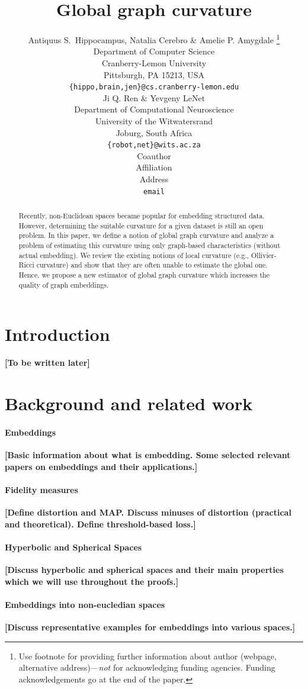 \documentclass{article} %
\title{Global graph curvature}
\author{Antiquus S.~Hippocampus, Natalia Cerebro \& Amelie P. Amygdale \thanks{ Use footnote for providing further information
about author (webpage, alternative address)---\emph{not} for acknowledging
funding agencies.  Funding acknowledgements go at the end of the paper.} \\
Department of Computer Science\\
Cranberry-Lemon University\\
Pittsburgh, PA 15213, USA \\
\texttt{\{hippo,brain,jen\}@cs.cranberry-lemon.edu} \\
\And
Ji Q. Ren \& Yevgeny LeNet \\
Department of Computational Neuroscience \\
University of the Witwatersrand \\
Joburg, South Africa \\
\texttt{\{robot,net\}@wits.ac.za} \\
\AND
Coauthor \\
Affiliation \\
Address \\
\texttt{email}
}
\begin{document}
\maketitle

\begin{abstract}
Recently, non-Euclidean spaces became popular for embedding structured data. However, determining the suitable curvature for a given dataset is still an open problem. 
In this paper, we define a notion of global graph curvature and analyze a problem of estimating this curvature using only graph-based characteristics (without actual embedding). 
We review the existing notions of local curvature (e.g., Ollivier-Ricci curvature) and show that they are often unable to estimate the global one. 
Hence, we propose a new estimator of global graph curvature which increases the quality of graph embeddings.
\end{abstract}

\section{Introduction}

\textbf{[To be written later]}

\section{Background and related work}

\paragraph{Embeddings} 
\textbf{[Basic information about what is embedding. Some selected relevant papers on embeddings and their applications.]}

\paragraph{Fidelity measures} \textbf{[Define distortion and MAP. Discuss minuses of distortion (practical and theoretical). Define threshold-based loss.]}

\paragraph{Hyperbolic and Spherical Spaces} \textbf{[Discuss hyperbolic and spherical spaces and their main properties which we will use throughout the proofs.]}

\paragraph{Embeddings into non-eucledian spaces} \textbf{[Discuss representative examples for embeddings into various spaces.]}
\end{document}
